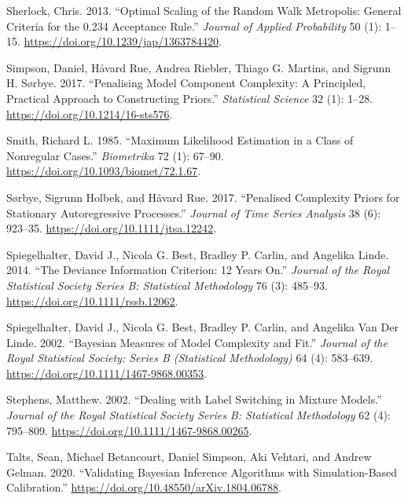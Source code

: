 \documentclass[
  11pt,
  letterpaper,
]{scrbook}
\newlength{\cslhangindent}
\newenvironment{CSLReferences}[2] %
 {\begin{list}{}{%
  \setlength{\itemindent}{0pt}
  \setlength{\leftmargin}{0pt}
  \setlength{\parsep}{0pt}
  \ifodd #1
   \setlength{\leftmargin}{\cslhangindent}
   \setlength{\itemindent}{-1\cslhangindent}
  \fi
  \setlength{\itemsep}{#2\baselineskip}}}
 {\end{list}}
\theoremstyle{definition}
\theoremstyle{definition}
\theoremstyle{definition}
\theoremstyle{plain}
\theoremstyle{plain}
\theoremstyle{plain}
\theoremstyle{remark}
\begin{document}
\begin{CSLReferences}{1}{0}
Sherlock, Chris. 2013. {``Optimal Scaling of the Random Walk
{M}etropolis: General Criteria for the 0.234 Acceptance Rule.''}
\emph{Journal of Applied Probability} 50 (1): 1--15.
\url{https://doi.org/10.1239/jap/1363784420}.

Simpson, Daniel, Håvard Rue, Andrea Riebler, Thiago G. Martins, and
Sigrunn H. Sørbye. 2017. {``Penalising Model Component Complexity: A
Principled, Practical Approach to Constructing Priors.''}
\emph{Statistical Science} 32 (1): 1--28.
\url{https://doi.org/10.1214/16-sts576}.

Smith, Richard L. 1985. {``Maximum Likelihood Estimation in a Class of
Nonregular Cases.''} \emph{Biometrika} 72 (1): 67--90.
\url{https://doi.org/10.1093/biomet/72.1.67}.

Sørbye, Sigrunn Holbek, and Håvard Rue. 2017. {``Penalised Complexity
Priors for Stationary Autoregressive Processes.''} \emph{Journal of Time
Series Analysis} 38 (6): 923--35.
\url{https://doi.org/10.1111/jtsa.12242}.

Spiegelhalter, David J., Nicola G. Best, Bradley P. Carlin, and Angelika
Linde. 2014. {``The Deviance Information Criterion: 12 Years On.''}
\emph{Journal of the Royal Statistical Society Series B: Statistical
Methodology} 76 (3): 485--93. \url{https://doi.org/10.1111/rssb.12062}.

Spiegelhalter, David J., Nicola G. Best, Bradley P. Carlin, and Angelika
Van Der Linde. 2002. {``Bayesian Measures of Model Complexity and
Fit.''} \emph{Journal of the Royal Statistical Society: Series B
(Statistical Methodology)} 64 (4): 583--639.
\url{https://doi.org/10.1111/1467-9868.00353}.

Stephens, Matthew. 2002. {``Dealing with Label Switching in Mixture
Models.''} \emph{Journal of the Royal Statistical Society Series B:
Statistical Methodology} 62 (4): 795--809.
\url{https://doi.org/10.1111/1467-9868.00265}.

Talts, Sean, Michael Betancourt, Daniel Simpson, Aki Vehtari, and Andrew
Gelman. 2020. {``Validating {B}ayesian Inference Algorithms with
Simulation-Based Calibration.''}
\url{https://doi.org/10.48550/arXiv.1804.06788}.


\end{CSLReferences}
\end{document}
